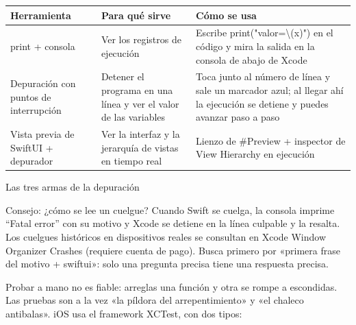 


\begin{center}
\begin{tabularx}{\linewidth}{|X|X|X|}
\hline
\textbf{Herramienta} & \textbf{Para qué sirve} & \textbf{Cómo se usa} \tabularnewline
\hline
print + consola & Ver los registros de ejecución & Escribe print("valor=\textbackslash{}(x)") en el código y mira la salida en la consola de abajo de Xcode \tabularnewline
Depuración con puntos de interrupción & Detener el programa en una línea y ver el valor de las variables & Toca junto al número de línea y sale un marcador azul; al llegar ahí la ejecución se detiene y puedes avanzar paso a paso \tabularnewline
Vista previa de SwiftUI + depurador & Ver la interfaz y la jerarquía de vistas en tiempo real & Lienzo de \#Preview + inspector de View Hierarchy en ejecución \tabularnewline
\hline
\end{tabularx}
\end{center}

\begin{center}\small\color{gray}Las tres armas de la depuración\end{center}

\begin{tcbinfo}{Consejo: ¿cómo se lee un cuelgue?}
Cuando Swift se cuelga, la consola imprime “Fatal error” con su motivo y Xcode se detiene en la línea culpable y la resalta. Los cuelgues históricos en dispositivos reales se consultan en Xcode Window Organizer Crashes (requiere cuenta de pago). Busca primero por «primera frase del motivo + swiftui»: solo una pregunta precisa tiene una respuesta precisa.

\end{tcbinfo}


Probar a mano no es fiable: arreglas una función y otra se rompe a escondidas. Las pruebas son a la vez «la píldora del arrepentimiento» y «el chaleco antibalas». iOS usa el framework XCTest, con dos tipos:

